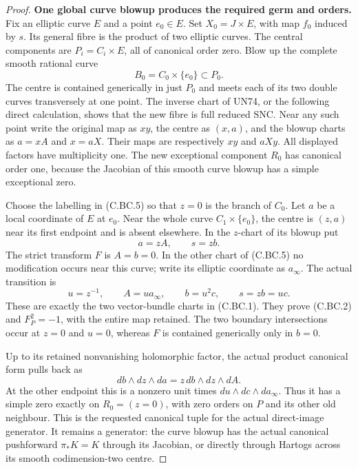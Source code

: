 \begin{proof}
\par\medskip\noindent\textbf{One global curve blowup produces the required germ and orders.}
Fix an elliptic curve \(E\) and a point \(e_0\in E\).
Set \(X_0=J\times E\), with map \(f_0\) induced by \(s\).
Its general fibre is the product of two elliptic curves.
The central components are \(P_i=C_i\times E\), all
of canonical order zero. Blow up the complete smooth
rational curve
\[
                      B_0=C_0\times\{e_0\}\subset P_0 .
                                                               \tag{C.BC.6}
\]
The centre is contained generically in just \(P_0\) and
meets each of its two double curves transversely at one
point. The inverse chart of UN74, or the following direct
calculation, shows that the new fibre is full reduced SNC.
Near any such point write the original map as \(xy\),
the centre as \((x,a)\), and the blowup charts as
\(a=xA\) and \(x=aX\). Their maps are respectively
\(xy\) and \(aXy\). All displayed factors have
multiplicity one. The new exceptional component \(R_0\)
has canonical order one, because the Jacobian of this
smooth curve blowup has a simple exceptional zero.

Choose the labelling in (C.BC.5) so that \(z=0\) is
the branch of \(C_0\). Let \(a\) be a local coordinate
of \(E\) at \(e_0\). Near the whole curve
\(C_1\times\{e_0\}\), the centre is \((z,a)\)
near its first endpoint and is absent elsewhere.
In the \(z\)-chart of its blowup put
\[
               a=zA,\qquad s=zb .                          \tag{C.BC.7}
\]
The strict transform \(F\) is \(A=b=0\). In the other
chart of (C.BC.5) no modification occurs near this curve;
write its elliptic coordinate as \(a_\infty\). The actual
transition is
\[
       u=z^{-1},\qquad A=u a_\infty,\qquad b=u^2c,
             \qquad s=zb=uc .                              \tag{C.BC.8}
\]
These are exactly the two vector-bundle charts in (C.BC.1).
They prove (C.BC.2) and \(F_P^2=-1\), with the entire
map retained. The two boundary intersections occur at
\(z=0\) and \(u=0\), whereas \(F\) is contained
generically only in \(b=0\).

Up to its retained nonvanishing holomorphic factor, the actual
product canonical form pulls back as
\[
 db\wedge dz\wedge da
       =z\,db\wedge dz\wedge dA .                          \tag{C.BC.9}
\]
At the other endpoint this is a nonzero unit times
\(du\wedge dc\wedge da_\infty\). Thus it has a simple
zero exactly on \(R_0=(z=0)\), with zero orders on
\(P\) and its other old neighbour. This is the requested
canonical tuple for the actual direct-image generator.
It remains a generator: the curve blowup has the actual
canonical pushforward \(\pi_*K=K\) through its Jacobian,
or directly through Hartogs across its smooth codimension-two
centre.


\end{proof}

